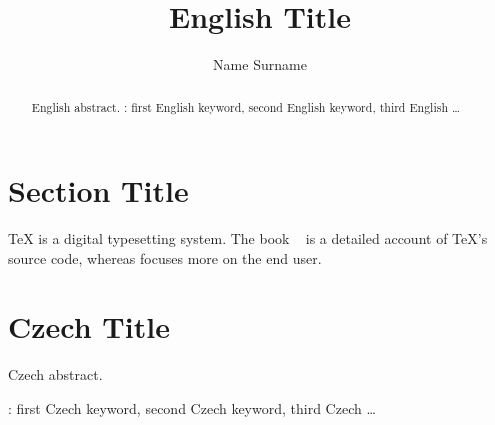 \documentclass{csbulletin}
\begin{document}
\title{English Title}
\author{Name Surname}
\maketitle

\begin{abstract}
English abstract.
\keywords: first English keyword, second English keyword, third English …
\end{abstract}

\section{Section Title}
\TeX{} is a digital typesetting system. The book ~\cite{knuth-ttp} is a detailed account of \TeX's source code, whereas \textcite{knuth-tb} focuses more on the end user.

\printbibliography

\section*{Czech Title}
\begin{otherlanguage}{czech}
Czech abstract.
\end{otherlanguage}
\klicovaslova: first Czech keyword, second Czech keyword, third Czech …
\end{document}

